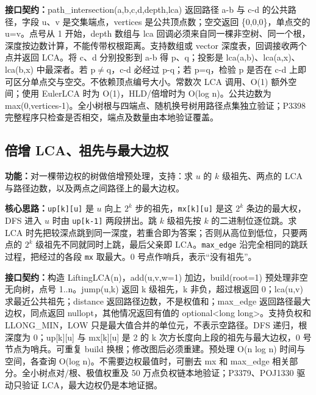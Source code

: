 {\sloppy{}\noindent\textbf{接口契约：}path\_intersection(a,b,c,d,depth,lca) 返回路径 a-b 与 c-d 的公共路径，字段 u、v 是交集端点，vertices 是公共顶点数；空交返回 \{0,0,0\}，单点交的 u=v。点号从 1 开始，depth 数组与 lca 回调必须来自同一棵非空树、同一个根，深度按边数计算，不能传带权根距离。支持数组或 vector 深度表，回调接收两个点并返回 LCA。将 c、d 分别投影到 a-b 得 p、q；投影是 lca(a,b)、lca(a,x)、lca(b,x) 中最深者。若 p$\ne$q，c-d 必经过 p-q；若 p=q，检验 p 是否在 c-d 上即可区分单点交与空交。不依赖顶点编号大小。常数次 LCA 调用、O(1) 额外空间；使用 EulerLCA 时为 O(1)，HLD/倍增时为 O(log n)。公共边数为 max(0,vertices-1)。全小树根与四端点、随机换号树用路径点集独立验证；P3398 完整程序只检查是否相交，端点及数量由本地验证覆盖。\par}



\Needspace{540pt}

\subsection{倍增 LCA、祖先与最大边权}\label{compact-LiftingLCA}

\noindent\textbf{功能：}\allowbreak 对一棵带边权的树做倍增预处理，支持：求 $u$ 的 $k$ 级祖先、两点的 LCA 与路径边数，以及两点之间路径上的最大边权。

\textbf{核心思路：}\allowbreak \texttt{up[k][u]} 是 $u$ 向上 $2^k$ 步的祖先，\texttt{mx[k][u]} 是这 $2^k$ 条边的最大权，DFS 进入 $u$ 时由 \texttt{up[k-1]} 两段拼出。跳 $k$ 级祖先按 $k$ 的二进制位逐位跳。求 LCA 时先把较深点跳到同一深度，若重合即为答案；否则从高位到低位，只要两点的 $2^k$ 级祖先不同就同时上跳，最后父亲即 LCA。\texttt{max\_edge} 沿完全相同的跳跃过程，把经过的各段 \texttt{mx} 取最大。0 号点作哨兵，表示“没有祖先”。



{\sloppy{}\noindent\textbf{接口契约：}构造 LiftingLCA(n)，add(u,v,w=1) 加边，build(root=1) 预处理非空无向树，点号 1..n。jump(u,k) 返回 k 级祖先，k 非负，超过根返回 0；lca(u,v) 求最近公共祖先；distance 返回路径边数，不是权值和；max\_edge 返回路径最大边权，同点返回 nullopt，其他情况返回有值的 optional<long long>。支持负权和 LLONG\_MIN，LOW 只是最大值合并的单位元，不表示空路径。DFS 递归，根深度为 0；up[k][u] 与 mx[k][u] 是 2 的 k 次方长度向上段的祖先与最大边权，0 号节点为哨兵。可重复 build 换根；修改图后必须重建。预处理 O(n log n) 时间与空间，各查询 O(log n)。不需要边权最值时，可删去 mx 和 max\_edge 相关部分。全小树点对/根、极值权重及 50 万点负权链本地验证；P3379、POJ1330 驱动只验证 LCA，最大边权仍是本地证据。\par}

